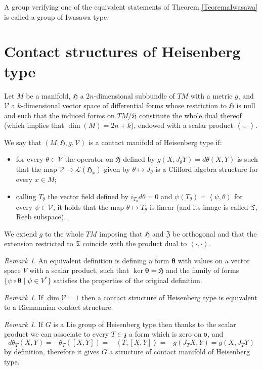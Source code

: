 \documentclass{article}
\newcommand{\ci}[1]{\mathscr{#1}}%
\newcommand{\g}[1]{\mathfrak{#1}}
\newcommand{\bra}{\left\langle}
\newcommand{\ket}{\right\rangle}
\newcommand{\rosso}[1]{{\color{red}#1}}
\theoremstyle{definition}
\theoremstyle{remark}
\newtheorem{osservazione}[proposizione]{Remark}
\begin{document}
A group verifying one of the equivalent statements of Theorem \ref{TeoremaIwasawa} is called a group of Iwasawa type.

\section{Contact structures of Heisenberg type}\label{SezioneDefinizione}
Let $M$ be a manifold, $\g{H}$ a $2n$-dimensional subbundle of $TM$ with a metric $g$, and $\ci{V}$ a $k$-dimensional vector space of differential forms whose restriction to $\g{H}$ is null and such that the induced forms on $TM/\g{H}$ constitute the whole dual thereof (which implies that $\dim(M)=2n+k$), endowed with a scalar product $\bra\cdot,\cdot\ket$.

We say that $(M,\g{H},g,\ci{V})$ is a contact manifold of Heisenberg type if:
\begin{itemize}
 \item for every $\theta\in\ci{V}$ the operator on $\g{H}$ defined by $g(X,J_{\theta}Y)=d\theta(X,Y)$ is such that the map $\ci{V}\to\ci{L}(\g{H}_x)$ given by $\theta\mapsto J_{\theta}$ is a Clifford algebra structure for every $x\in M$;
 \item calling $T_{\theta}$ the vector field defined by $i_{T_{\theta}}d\theta=0$ and $\psi(T_{\theta})=\bra\psi,\theta\ket$ for every $\psi\in\ci{V}$, it holds that the map $\theta\mapsto T_{\theta}$ is linear (and its image is called $\g{T}$, Reeb subspace).
\end{itemize}

We extend $g$ to the whole $TM$ imposing that $\g{H}$ and $\g{Z}$ be orthogonal and that the extension restricted to $\g{T}$ coincide with the product dual to $\bra\cdot,\cdot\ket$.

\begin{osservazione}
 An equivalent definition is defining a form $\bm{\theta}$ with values on a vector space $V$ with a scalar product, such that $\ker\bm{\theta}=\g{H}$ and the family of forms $\{\psi\circ\bm{\theta}\;|\;\psi\in V^*\}$ satisfies the properties of the original definition.
\end{osservazione}

\begin{osservazione}\label{OssRiemCont}
 If $\dim\ci{V}=1$ then a contact structure of Heisenberg type is equivalent to a Riemannian contact structure.
\end{osservazione}

\begin{osservazione}\label{Gruppi}
 If $G$ is a Lie group of Heisenberg type then thanks to the scalar product we can associate to every $T\in\g{z}$ a form which is zero on $\g{v}$, and
 $$d\theta_T(X,Y) = -\theta_T([X,Y]) = -\bra T,[X,Y]\ket =  -g(J_TX,Y) = g(X,J_TY)$$
 by definition, therefore it gives $G$ a structure of contact manifold of Heisenberg type.
\end{osservazione}
\end{document}
